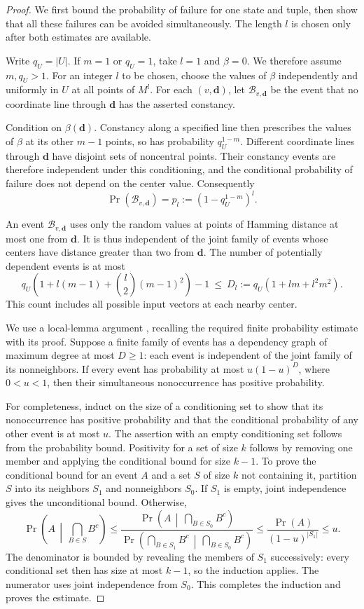 \begin{proof}
We first bound the probability of failure for one state and tuple, then
show that all these failures can be avoided simultaneously. The length
$l$ is chosen only after both estimates are available.

Write $q_U=|U|$. If $m=1$ or $q_U=1$, take $l=1$ and $\beta=0$.
We therefore assume $m,q_U>1$.
For an integer $l$ to be chosen, choose the values of $\beta$
independently and uniformly in $U$ at all points of $M^l$.
For each $(v,\mathbf d)$, let $\mathcal B_{v,\mathbf d}$ be the event
that no coordinate line through $\mathbf d$ has the asserted
constancy.

Condition on $\beta(\mathbf d)$. Constancy along a specified line
then prescribes the values of $\beta$ at its other $m-1$ points, so
has probability $q_U^{1-m}$. Different coordinate lines through
$\mathbf d$ have disjoint sets of noncentral points. Their constancy
events are therefore independent under this conditioning, and the
conditional probability of failure does not depend on the center
value. Consequently
\[
 \Pr(\mathcal B_{v,\mathbf d})
 =p_l:=(1-q_U^{1-m})^l.
\]

An event $\mathcal B_{v,\mathbf d}$ uses only the random values at
points of Hamming distance at most one from $\mathbf d$. It is thus
independent of the joint family of events whose centers have distance
greater than two from $\mathbf d$. The number of potentially
dependent events is at most
\[
 q_U\left(1+l(m-1)+\binom l2(m-1)^2\right)-1
 \ \le\ D_l:=q_U(1+lm+l^2m^2).
\]
This count includes all possible input vectors at each nearby center.

We use a local-lemma argument \citep[Section~2, pp.~616--617]{ErdosLovasz1975},
recalling the required finite probability estimate with its proof.
Suppose a finite family of events has a dependency graph of maximum
degree at most $D\ge1$: each event is independent of the joint family
of its nonneighbors. If every event has probability at most
$u(1-u)^D$, where $0<u<1$, then their simultaneous nonoccurrence
has positive probability.

For completeness, induct on the size of a conditioning set to show
that its nonoccurrence has positive probability and that the
conditional probability of any other event is at most $u$.
The assertion with an empty conditioning set follows from the
probability bound. Positivity for a set of size $k$ follows by
removing one member and applying the conditional bound for size
$k-1$. To prove the conditional bound for an event $A$ and a set
$S$ of size $k$ not containing it, partition $S$ into its neighbors
$S_1$ and nonneighbors $S_0$. If $S_1$ is empty, joint independence
gives the unconditional bound. Otherwise,
\[
 \Pr\left(A\,\middle|\,\bigcap_{B\in S}B^c\right)
 \le
 \frac{\Pr\left(A\,\middle|\,\bigcap_{B\in S_0}B^c\right)}
 {\Pr\left(\bigcap_{B\in S_1}B^c\,\middle|\,
                    \bigcap_{B\in S_0}B^c\right)}
 \le \frac{\Pr(A)}{(1-u)^{|S_1|}}
 \le u.
\]
The denominator is bounded by revealing the members of $S_1$
successively: every conditional set then has size at most $k-1$,
so the induction applies. The numerator uses joint independence
from $S_0$. This completes the induction and proves the estimate.


\end{proof}
